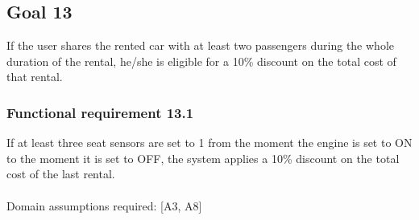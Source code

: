 \subsection{Goal 13}
If the user shares the rented car with at least two passengers during the whole duration of the rental, he/she is eligible for a 10\% discount on the total cost of that rental.

\setcounter{secnumdepth}{3}
\subsubsection{Functional requirement 13.1}
If at least three seat sensors are set to 1 from the moment the engine is set to ON to the moment it is set to OFF, the system applies a 10\% discount on the total cost of the last rental.\\~\\
\noindent Domain assumptions required: [A3, A8]